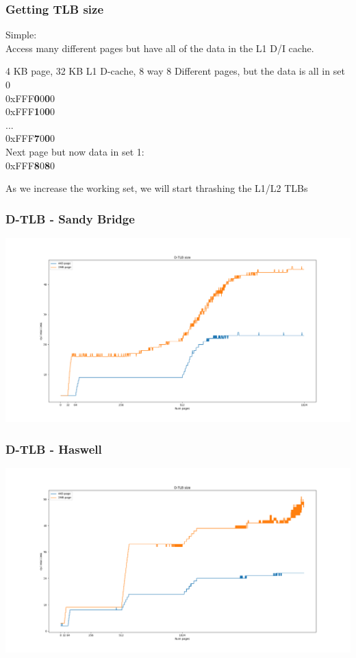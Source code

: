 \documentclass{beamer}
\begin{document}
\begin{frame}
\frametitle{Getting TLB size}
Simple:\\
Access many different pages but have all of the data in the L1 D/I cache.
\begin{block}{4 KB page, 32 KB L1 D-cache, 8 way}
8 Different pages, but the data is all in set 0\\
0xFFF\textbf{0}0\textbf{0}0\\
0xFFF\textbf{1}0\textbf{0}0\\
...\\
0xFFF\textbf{7}0\textbf{0}0\\
Next page but now data in set 1:\\
0xFFF\textbf{8}0\textbf{8}0\\
\end{block}
As we increase the working set, we will start thrashing the L1/L2 TLBs
\end{frame}

\begin{frame}
\frametitle{D-TLB - Sandy Bridge}
\includegraphics[scale=.26]{img/dtlb_size_sandybridge.png}
\end{frame}

\begin{frame}
\frametitle{D-TLB - Haswell}
\includegraphics[scale=.26]{img/dtlb_size_haswell.png}
\end{frame}
\end{document}
